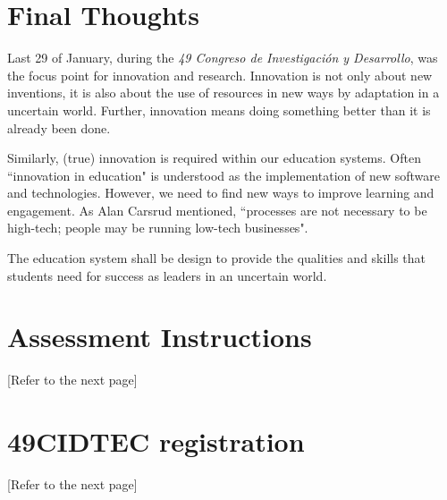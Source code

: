 \documentclass[11pt,a4paper]{article}
\begin{document}
\section{Final Thoughts}\label{sec:final}
Last 29 of January, during the \emph{49 Congreso de Investigación y Desarrollo}, was the focus point for innovation and research. Innovation is not only about new inventions, it is also about the use of resources in new ways by adaptation in a uncertain world. Further, innovation means doing something better than it is already been done.

Similarly, (true) innovation is required within our education systems. Often ``innovation in education" is understood as the implementation of new software and technologies. However, we need to find new ways to improve learning and engagement. As Alan Carsrud mentioned, ``processes are not necessary to be high-tech; people may be running low-tech businesses".

The education system shall be design to provide the qualities and skills that students need for success as leaders in an uncertain world.


\clearpage
\printbibliography

\appendix %

\section{Assessment Instructions}\label{sec:instructions}
[Refer to the next page]


\section{49CIDTEC registration}\label{sec:registration}
[Refer to the next page]


\end{document}
